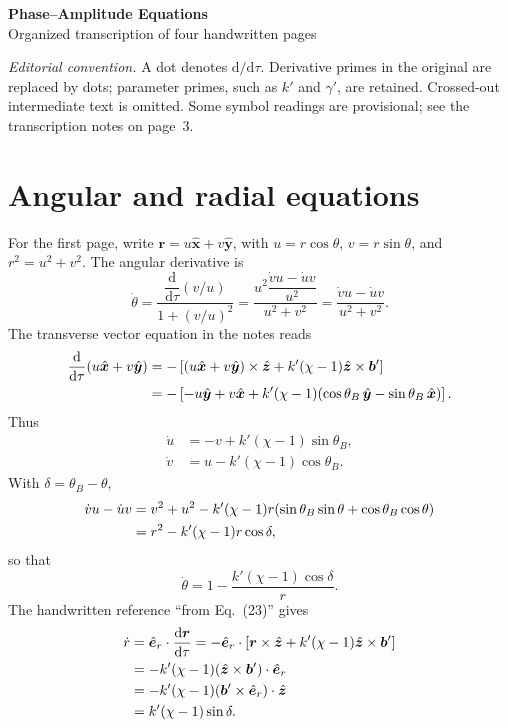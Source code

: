 \documentclass[11pt,a4paper]{article}
\newcommand{\dd}{\mathrm{d}}
\newcommand{\er}{\hat{\bm e}_r}
\newcommand{\ez}{\hat{\bm z}}
\newcommand{\ex}{\hat{\bm x}}
\newcommand{\ey}{\hat{\bm y}}
\begin{document}
\begin{center}
{\LARGE\bfseries Phase--Amplitude Equations}\\[5pt]
{\large Organized transcription of four handwritten pages}
\end{center}

\textit{Editorial convention.} A dot denotes $\dd/\dd\tau$. Derivative
primes in the original are replaced by dots; parameter primes, such as $k'$
and $\gamma'$, are retained. Crossed-out intermediate text is omitted.
Some symbol readings are provisional; see the transcription notes on page~3.

\section{Angular and radial equations}
For the first page, write $\bm r=u\ex+v\ey$, with
$u=r\cos\theta$, $v=r\sin\theta$, and $r^2=u^2+v^2$.
The angular derivative is
\begin{equation}
\dot\theta
=\frac{\dfrac{\dd}{\dd\tau}(v/u)}{1+(v/u)^2}
=\frac{u^2\dfrac{\dot v u-\dot u v}{u^2}}{u^2+v^2}
=\frac{\dot v u-\dot u v}{u^2+v^2}.
\end{equation}
The transverse vector equation in the notes reads
\begin{align}
\frac{\dd}{\dd\tau}(u\ex+v\ey)
&=-\left[(u\ex+v\ey)\times\ez
+k'(\chi-1)\ez\times\bm b'\right] \notag\\
&=-\left[-u\ey+v\ex
+k'(\chi-1)(\cos\theta_B\,\ey-\sin\theta_B\,\ex)\right].
\end{align}
Thus
\begin{equation}
\boxed{\begin{aligned}
\dot u&=-v+k'(\chi-1)\sin\theta_B,\\
\dot v&=u-k'(\chi-1)\cos\theta_B.
\end{aligned}}
\end{equation}
With $\delta=\theta_B-\theta$,
\begin{align}
\dot v u-\dot u v
&=v^2+u^2-k'(\chi-1)r
 (\sin\theta_B\sin\theta+\cos\theta_B\cos\theta)\notag\\
&=r^2-k'(\chi-1)r\cos\delta,
\end{align}
so that
\begin{equation}
\boxed{\dot\theta=1-\frac{k'(\chi-1)\cos\delta}{r}.}
\end{equation}
The handwritten reference ``from Eq.~(23)'' gives
\begin{align}
\dot r
&=\er\cdot\frac{\dd\bm r}{\dd\tau}
=-\er\cdot\left[\bm r\times\ez
+k'(\chi-1)\ez\times\bm b'\right]\notag\\
&=-k'(\chi-1)(\ez\times\bm b')\cdot\er\notag\\
&=-k'(\chi-1)(\bm b'\times\er)\cdot\ez\notag\\
&=k'(\chi-1)\sin\delta.
\end{align}
\end{document}
